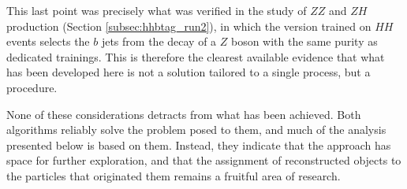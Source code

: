 This last point was precisely what was verified in the study of $ZZ$ and $ZH$ production (Section \ref{subsec:hhbtag_run2}), in which the version trained on $HH$ events selects the $b$ jets from the decay of a $Z$ boson with the same purity as dedicated trainings. This is therefore the clearest available evidence that what has been developed here is not a solution tailored to a single process, but a procedure.


None of these considerations detracts from what has been achieved. Both algorithms reliably solve the problem posed to them, and much of the analysis presented below is based on them. Instead, they indicate that the approach has space for further exploration, and that the assignment of reconstructed objects to the particles that originated them remains a fruitful area of research.

